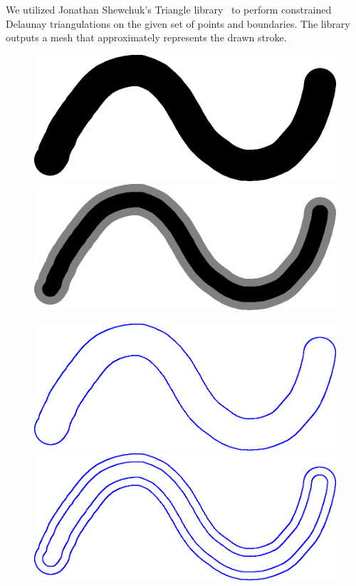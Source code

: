 \documentclass[review]{acmsiggraph}
\begin{document}
We utilized Jonathan Shewchuk's Triangle library~\cite{shewchuk2002} to perform constrained Delaunay triangulations
on the given set of points and boundaries. The library outputs a mesh that
approximately represents the drawn stroke.

\begin{figure}
    \centering
    \setlength{\w}{0.45\columnwidth}

        \includegraphics[width=\w]{images/stroke_triangulation/hardrendered}
        \includegraphics[width=\w]{images/stroke_triangulation/softrendered}
        
        \includegraphics[width=\w]{images/stroke_triangulation/hardpruned}
        \includegraphics[width=\w]{images/stroke_triangulation/softpruned}
        

\end{figure}
\end{document}

